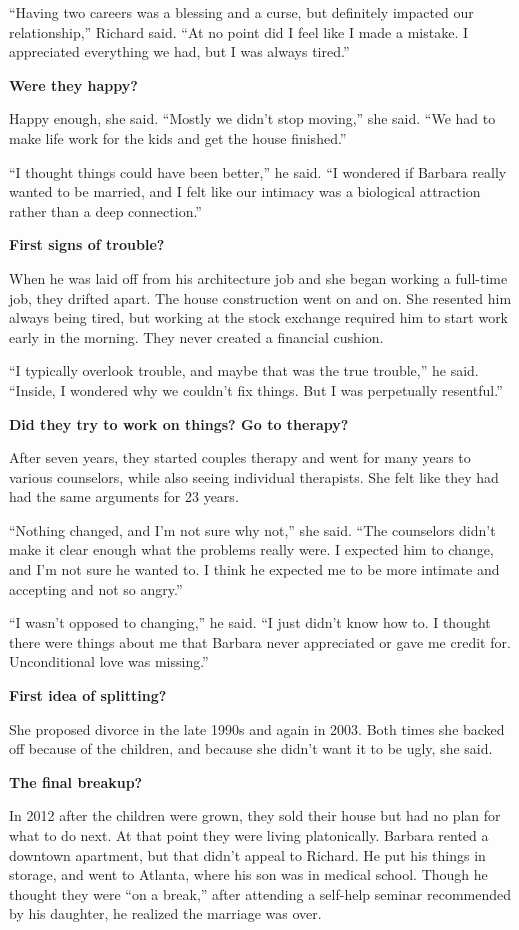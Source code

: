 ``Having two careers was a blessing and a curse, but definitely impacted
our relationship,'' Richard said. ``At no point did I feel like I made a
mistake. I appreciated everything we had, but I was always tired.''

\textbf{Were they happy?}

Happy enough, she said. ``Mostly we didn't stop moving,'' she said. ``We
had to make life work for the kids and get the house finished.''

``I thought things could have been better,'' he said. ``I wondered if
Barbara really wanted to be married, and I felt like our intimacy was a
biological attraction rather than a deep connection.''

\textbf{First signs of trouble?}

When he was laid off from his architecture job and she began working a
full-time job, they drifted apart. The house construction went on and
on. She resented him always being tired, but working at the stock
exchange required him to start work early in the morning. They never
created a financial cushion.

``I typically overlook trouble, and maybe that was the true trouble,''
he said. ``Inside, I wondered why we couldn't fix things. But I was
perpetually resentful.''

\textbf{Did they try to work on things? Go to therapy?}

After seven years, they started couples therapy and went for many years
to various counselors, while also seeing individual therapists. She felt
like they had had the same arguments for 23 years.

``Nothing changed, and I'm not sure why not,'' she said. ``The
counselors didn't make it clear enough what the problems really were. I
expected him to change, and I'm not sure he wanted to. I think he
expected me to be more intimate and accepting and not so angry.''

``I wasn't opposed to changing,'' he said. ``I just didn't know how to.
I thought there were things about me that Barbara never appreciated or
gave me credit for. Unconditional love was missing.''

\textbf{First idea of splitting?}

She proposed divorce in the late 1990s and again in 2003. Both times she
backed off because of the children, and because she didn't want it to be
ugly, she said.

\textbf{The final breakup?}

In 2012 after the children were grown, they sold their house but had no
plan for what to do next. At that point they were living platonically.
Barbara rented a downtown apartment, but that didn't appeal to Richard.
He put his things in storage, and went to Atlanta, where his son was in
medical school. Though he thought they were ``on a break,'' after
attending a self-help seminar recommended by his daughter, he realized
the marriage was over.

